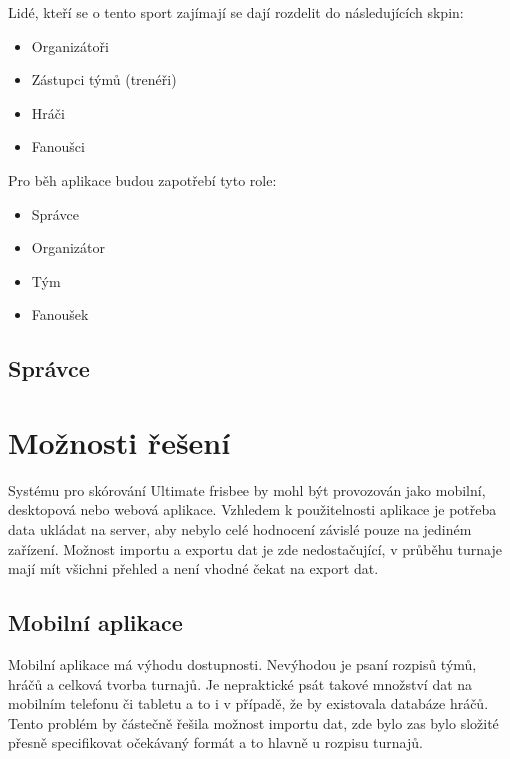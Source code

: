 \documentclass[thesis=B,czech]{FITthesis}[2012/06/26]
\begin{document}
		Lidé, kteří se o tento sport zajímají se dají rozdelit do následujících skpin:

		\begin{itemize}
			\item Organizátoři
			\item Zástupci týmů (trenéři)
			\item Hráči
			\item Fanoušci
		\end{itemize}

		Pro běh aplikace budou zapotřebí tyto role:

		\begin{itemize}
			\item Správce
			\item Organizátor
			\item Tým
			\item Fanoušek
		\end{itemize}

		\subsection{Správce}




	\section{Možnosti řešení}
		Systému pro skórování Ultimate frisbee by mohl být provozován jako mobilní, desktopová nebo webová aplikace. Vzhledem k použitelnosti aplikace je potřeba data ukládat na server, aby nebylo celé hodnocení závislé pouze na jediném zařízení. Možnost importu a exportu dat je zde nedostačující, v průběhu turnaje mají mít všichni přehled a není vhodné čekat na export dat.
		
		\subsection{Mobilní aplikace}
			Mobilní aplikace má výhodu dostupnosti. Nevýhodou je psaní rozpisů týmů, hráčů a celková tvorba turnajů. Je nepraktické psát takové množství dat na mobilním telefonu či tabletu a to i v případě, že by existovala databáze hráčů. Tento problém by částečně řešila možnost importu dat, zde bylo zas bylo složité přesně specifikovat očekávaný formát a to hlavně u rozpisu turnajů.
		
\end{document}
